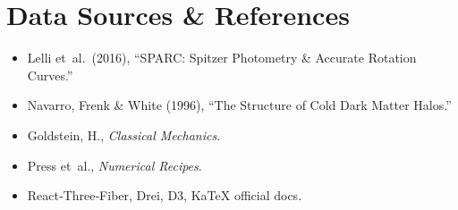 \documentclass[11pt]{article}
\begin{document}
\section{Data Sources \& References}
\begin{itemize}
  \item Lelli et al.\ (2016), “SPARC: Spitzer Photometry \& Accurate Rotation Curves.”  
  \item Navarro, Frenk \& White (1996), “The Structure of Cold Dark Matter Halos.”  
  \item Goldstein, H., \emph{Classical Mechanics}.  
  \item Press et al., \emph{Numerical Recipes}.  
  \item React‑Three‑Fiber, Drei, D3, KaTeX official docs.
\end{itemize}
\end{document}
